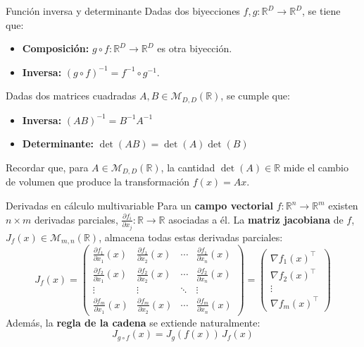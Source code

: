 \documentclass{beamer}
\newcommand{\R}{\mathbb{R}}
\begin{document}
\begin{frame}{Función inversa y determinante}
    Dadas dos biyecciones $f,g:\R^D\to\R^D$, se tiene que:
    \begin{itemize}
        \item \textbf{Composición:} $g\circ f:\R^D\to\R^D$ es otra biyección.
        \item \textbf{Inversa:} $(g\circ f)^{-1} = f^{-1}\circ g^{-1}$.
    \end{itemize}
    Dadas dos matrices cuadradas $A,B\in\mathcal{M}_{D,D}(\R)$, se cumple que:
    \begin{itemize}
        \item \textbf{Inversa:} $(AB)^{-1} = B^{-1}A^{-1}$
        \item \textbf{Determinante:} $\det(AB) = \det(A)\det(B)$
    \end{itemize}
    Recordar que, para $A\in\mathcal{M}_{D,D}(\R)$, la cantidad $\det(A)\in\R$ mide el cambio de volumen que produce la transformación $f(x)=Ax$.
\end{frame}

\begin{frame}{Derivadas en cálculo multivariable}
    Para un \textbf{campo vectorial} $f:\R^n\to\R^m$ existen $n\times m$ derivadas parciales, $\frac{\partial f_i}{\partial x_j}:\R\to\R$ asociadas a él. La \textbf{matriz jacobiana} de $f$, $J_f(x)\in\mathcal{M}_{m,n}(\R)$, almacena todas estas derivadas parciales:
    \begin{equation*}
        J_f(x) = \begin{pmatrix}
            \frac{\partial f_1}{\partial x_1}(x) & \frac{\partial f_1}{\partial x_2}(x) & \cdots & \frac{\partial f_1}{\partial x_n}(x) \\
            \frac{\partial f_2}{\partial x_1}(x) & \frac{\partial f_2}{\partial x_2}(x) & \cdots & \frac{\partial f_2}{\partial x_n}(x) \\
            \vdots                               & \vdots                               & \ddots & \vdots                               \\
            \frac{\partial f_m}{\partial x_1}(x) & \frac{\partial f_m}{\partial x_2}(x) & \cdots & \frac{\partial f_m}{\partial x_n}(x)
        \end{pmatrix}
        = \begin{pmatrix}
            \nabla f_1(x)^\top \\
            \nabla f_2(x)^\top \\
            \vdots             \\
            \nabla f_m(x)^\top
        \end{pmatrix}
    \end{equation*}
    Además, la \textbf{regla de la cadena} se extiende naturalmente:
    \begin{equation*}
        J_{g\circ f}(x) = J_g(f(x))\,J_f(x)
    \end{equation*}
\end{frame}
\end{document}
